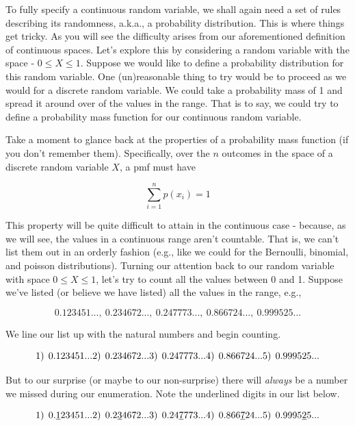 \documentclass[
]{book}
\theoremstyle{definition}
\theoremstyle{definition}
\theoremstyle{definition}
\theoremstyle{definition}
\theoremstyle{remark}
\begin{document}
To fully specify a continuous random variable, we shall again need a set of rules describing its randomness, a.k.a., a probability distribution. This is where things get tricky. As you will see the difficulty arises from our aforementioned definition of continuous spaces. Let's explore this by considering a random variable with the space - \(0 \leq X \leq 1\). Suppose we would like to define a probability distribution for this random variable. One (un)reasonable thing to try would be to proceed as we would for a discrete random variable. We could take a probability mass of 1 and spread it around over of the values in the range. That is to say, we could try to define a probability mass function for our continuous random variable.

Take a moment to glance back at the properties of a probability mass function (if you don't remember them). Specifically, over the \(n\) outcomes in the space of a discrete random variable \(X\), a pmf must have

\[
\sum_{i = 1}^{n} p(x_i) = 1
\]

This property will be quite difficult to attain in the continuous case - because, as we will see, the values in a continuous range aren't countable. That is, we can't list them out in an orderly fashion (e.g., like we could for the Bernoulli, binomial, and poisson distributions). Turning our attention back to our random variable with space \(0 \leq X \leq 1\), let's try to count all the values between 0 and 1. Suppose we've listed (or believe we have listed) all the values in the range, e.g.,

\[
0.123451..., \:0.234672...,\:0.247773...,\:0.866724...,\:0.999525...
\]

We line our list up with the natural numbers and begin counting.

\[
1) \:\: 0.123451...\\
2) \:\: 0.234672...\\
3) \:\: 0.247773...\\
4) \:\: 0.866724...\\
5) \:\: 0.999525...
\]

But to our surprise (or maybe to our non-surprise) there will \emph{always} be a number we missed during our enumeration. Note the underlined digits in our list below.

\[
1) \:\: 0.\underline{1}23451...\\
2) \:\: 0.2\underline{3}4672...\\
3) \:\: 0.24\underline{7}773...\\
4) \:\: 0.866\underline{7}24...\\
5) \:\: 0.9995\underline{2}5...
\]
\end{document}
